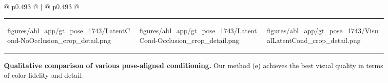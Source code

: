 \begin{figure}[!t]
\begin{tabular}{@{} p{0.493\linewidth} @{\hspace{1.5pt}} | @{\hspace{1.5pt}} p{0.493\linewidth} @{}}
{\begin{tabular}{*{3}{>{\centering\arraybackslash}m{\imgsize}}}
    \begin{overpic}[width=\imgsize]{figures/abl_app/gt_pose_1743/LatentCond-NoOcclusion_crop_detail.png}\cornerlabel{(c)}\end{overpic} &
    \begin{overpic}[width=\imgsize]{figures/abl_app/gt_pose_1743/LatentCond-Occlusion_crop_detail.png}\cornerlabel{(d)}\end{overpic} &
    \begin{overpic}[width=\imgsize]{figures/abl_app/gt_pose_1743/VisualLatentCond_crop_detail.png}\cornerlabel{(e)}\end{overpic} \\
\end{tabular}
}
\end{tabular}

\caption{
\textbf{Qualitative comparison of various pose-aligned conditioning.} Our method (e) achieves the best visual quality in terms of color fidelity and detail.
}\label{fig:abl_appearance}
\end{figure}